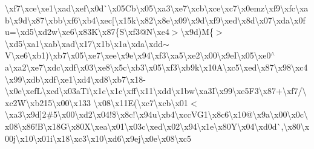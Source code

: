 \textbackslash{}xf7\textbackslash{}xce\textbackslash{}xe1\textbackslash{}xad\textbackslash{}xef\textbackslash{}x0d\`{}\textbackslash{}x05\+Cb\textbackslash{}x05\textbackslash{}xa3\textbackslash{}xe7\textbackslash{}xcb\textbackslash{}xce\textbackslash{}xc7\textbackslash{}x0emz\textbackslash{}xf9\textbackslash{}xfc\textbackslash{}xab\textbackslash{}x9d\textbackslash{}x87\textbackslash{}xbb\textbackslash{}xf6\textbackslash{}xb4\textbackslash{}xec\mbox{[}\textbackslash{}x15k\textbackslash{}x82\textbackslash{}x8e\textbackslash{}x09\textbackslash{}x9d\textbackslash{}xf9\textbackslash{}xed\textbackslash{}x8d\textbackslash{}x07\textbackslash{}xda\textbackslash{}x0fu=\textbackslash{}xd5\textbackslash{}xd2w\textbackslash{}xe6\textbackslash{}x83\+K\textbackslash{}x87\{\+S\textbackslash{}xf3@\+N\textbackslash{}xe4$>$\textbackslash{}x9d)\+M\{$>$\textbackslash{}xd5\textbackslash{}xa1\textbackslash{}xab\textbackslash{}xad\textbackslash{}x17\textbackslash{}x1b\textbackslash{}x1a\textbackslash{}xda\textbackslash{}xdd$\sim$\+V\textbackslash{}xe6\textbackslash{}xb1)\textbackslash{}xb7\textbackslash{}x05\textbackslash{}xe7\textbackslash{}xee\textbackslash{}x9e\textbackslash{}x94\textbackslash{}xf3\textbackslash{}xa5\textbackslash{}xe2\textquotesingle{}\textbackslash{}x00\textbackslash{}x9e\+I\textbackslash{}x05\textbackslash{}xe0$^\wedge$a\textbackslash{}xa2\textbackslash{}xe7\textbackslash{}xdc\textbackslash{}xdf\textbackslash{}x03\textbackslash{}xe8\textbackslash{}x5c\textbackslash{}xb3\textbackslash{}x05\textbackslash{}xf3\textbackslash{}xb9k\textbackslash{}x10\+A\textbackslash{}xc5\textbackslash{}xed\textbackslash{}x87\textbackslash{}x98\textbackslash{}xc4\textbackslash{}x99\textbackslash{}xdb\textbackslash{}xdf\textbackslash{}xe1\textbackslash{}xd4\textbackslash{}xd8\textbackslash{}xb7\textbackslash{}x18-\/\textbackslash{}x0e\textbackslash{}xef\+L\textbackslash{}xcd\textbackslash{}x03a\+Ti\textbackslash{}x1c\textbackslash{}x1c\textbackslash{}xff\textbackslash{}x11\textbackslash{}xdd\textbackslash{}x1bw\textbackslash{}xa3\+I\textbackslash{}x99\textbackslash{}xe5\+F3\textbackslash{}x87+\textbackslash{}xf7/\textbackslash{}xc2\+W\textbackslash{}xb215\textbackslash{}x00\textbackslash{}x133 \textbackslash{}x08\textbackslash{}x11\+E(\textbackslash{}xc7\textbackslash{}xcb\textbackslash{}x01$<$\textbackslash{}xa3\textbackslash{}x9d\mbox{]}2\#5\textbackslash{}x00\textbackslash{}xd2\textbackslash{}x04!\$\textbackslash{}x8c!\textbackslash{}x94u\textbackslash{}xb4\textbackslash{}xcc\+V\+G1\textbackslash{}x8c6\textbackslash{}x10@\textbackslash{}x9a\textbackslash{}x00\textbackslash{}x0c\textbackslash{}x08\textbackslash{}x86!\+B\textbackslash{}x18\+G\textbackslash{}x80\+X\textbackslash{}xea\textbackslash{}x01\textbackslash{}x03c\textbackslash{}xed\textbackslash{}x02\textbackslash{}x94\textbackslash{}x1e\textbackslash{}x80\+Y\textbackslash{}x04\textbackslash{}xd0d\`{},\textbackslash{}x80\textbackslash{}x00j\textbackslash{}x10\textbackslash{}x01i\textbackslash{}x18\textbackslash{}xc3\textbackslash{}x10\textbackslash{}xd6\textbackslash{}x9ej\textbackslash{}x0e\textbackslash{}x08\textbackslash{}xc5 
